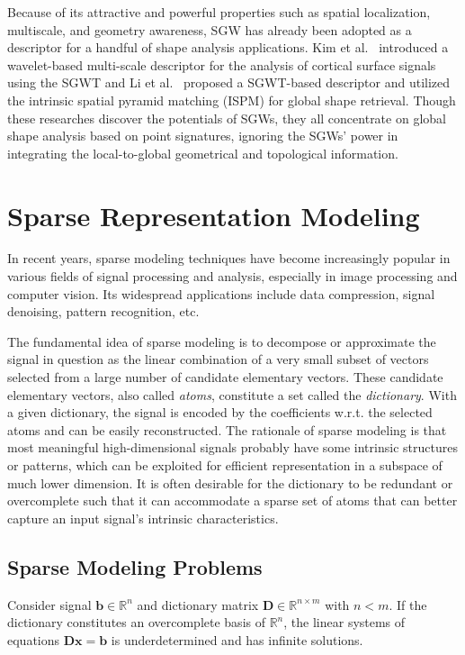 Because of its attractive and powerful properties such as spatial localization,
multiscale, and geometry awareness, SGW has already been adopted as a descriptor
for a handful of shape analysis applications. Kim et al.~\cite{Kim:2012,Kim:2014}
introduced a wavelet-based multi-scale descriptor for the analysis of
cortical surface signals using the SGWT and Li et al.~\cite{Li:2013}
proposed a SGWT-based descriptor and utilized the intrinsic spatial
pyramid matching (ISPM) for global shape retrieval. Though these
researches discover the potentials of SGWs, they all concentrate on
global shape analysis based on point signatures, ignoring the SGWs'
power in integrating the local-to-global geometrical and topological information.

\section{Sparse Representation Modeling}

In recent years, sparse modeling techniques have become
increasingly popular in various fields of signal processing and
analysis, especially in image processing and computer vision. Its
widespread applications include data compression, signal denoising,
pattern recognition, etc.

The fundamental idea of sparse modeling is to decompose or approximate the
signal in question as the linear combination of a very small subset of vectors
selected from a large number of candidate elementary vectors. These candidate
elementary vectors, also called \emph{atoms}, constitute a set called the
\emph{dictionary}. With a given dictionary, the signal is encoded by the
coefficients w.r.t. the selected atoms and can be easily reconstructed. The
rationale of sparse modeling is that most meaningful high-dimensional signals probably
have some intrinsic structures or patterns, which can be exploited for
efficient representation in a subspace of much lower dimension.
It is often desirable for the dictionary to be redundant or overcomplete such that
it can accommodate a sparse set of atoms that can better capture
an input signal's intrinsic characteristics.

\subsection{Sparse Modeling Problems}

Consider signal $\mathbf{b}\in\mathbb{R}^n$ and dictionary matrix
$\mathbf{D}\in\mathbb{R}^{n\times m}$ with $n<m$. If the dictionary constitutes an
overcomplete basis of $\mathbb{R}^n$, the linear systems of
equations $\mathbf{D}\mathbf{x}=\mathbf{b}$ is underdetermined and has infinite solutions.

